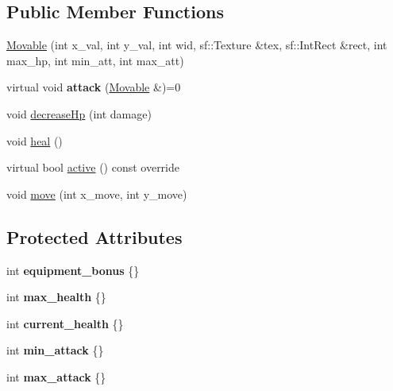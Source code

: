 \subsection*{Public Member Functions}
\begin{DoxyCompactItemize}
\item 
\hyperlink{classMovable_ab8074e1b870b06f5b7a2d93bc9f4a301}{Movable} (int x\+\_\+val, int y\+\_\+val, int wid, sf\+::\+Texture \&tex, sf\+::\+Int\+Rect \&rect, int max\+\_\+hp, int min\+\_\+att, int max\+\_\+att)
\item 
\hypertarget{classMovable_a6c90cd27651dcaae3673bf28bb9fa449}{virtual void {\bfseries attack} (\hyperlink{classMovable}{Movable} \&)=0}\label{classMovable_a6c90cd27651dcaae3673bf28bb9fa449}

\item 
void \hyperlink{classMovable_aa4f081848db7837daa7b6d6af25971bb}{decrease\+Hp} (int damage)
\item 
void \hyperlink{classMovable_ad247575b21471febb50f33cad3f7d5af}{heal} ()
\item 
virtual bool \hyperlink{classMovable_ad2c29da05cc65237d275e949cb4d6eb9}{active} () const override
\item 
void \hyperlink{classMovable_af86996f178b7acd13212d42bb3742c7c}{move} (int x\+\_\+move, int y\+\_\+move)
\end{DoxyCompactItemize}
\subsection*{Protected Attributes}
\begin{DoxyCompactItemize}
\item 
\hypertarget{classMovable_a0d351ec6b52976cfb30e811f9466c74c}{int {\bfseries equipment\+\_\+bonus} \{\}}\label{classMovable_a0d351ec6b52976cfb30e811f9466c74c}

\item 
\hypertarget{classMovable_a33933f3a87bdb382a3971946dec26573}{int {\bfseries max\+\_\+health} \{\}}\label{classMovable_a33933f3a87bdb382a3971946dec26573}

\item 
\hypertarget{classMovable_acebe27308e28f1a8ef1afc0975903277}{int {\bfseries current\+\_\+health} \{\}}\label{classMovable_acebe27308e28f1a8ef1afc0975903277}

\item 
\hypertarget{classMovable_ab89bbd5a67c47bc4a9c7f146df34fca5}{int {\bfseries min\+\_\+attack} \{\}}\label{classMovable_ab89bbd5a67c47bc4a9c7f146df34fca5}

\item 
\hypertarget{classMovable_a979c78acad9247d5d7ed7b7761c96c2f}{int {\bfseries max\+\_\+attack} \{\}}\label{classMovable_a979c78acad9247d5d7ed7b7761c96c2f}

\end{DoxyCompactItemize}


